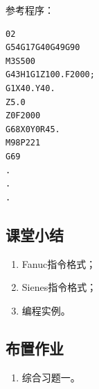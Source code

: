参考程序：
\begin{lstlisting}
02
G54G17G40G49G90
M3S500
G43H1G1Z100.F2000;
G1X40.Y40.
Z5.0
Z0F2000
G68X0Y0R45.
M98P221
G69
.
.
.

\end{lstlisting}

\subsection{课堂小结}
\begin{enumerate}[1、]
\item Fanuc指令格式；
\item Sienes指令格式；
\item 编程实例。
\end{enumerate}

\vfill
\subsection{布置作业}
\begin{enumerate}[1、]
	\item 综合习题一。
\end{enumerate}
\vfill